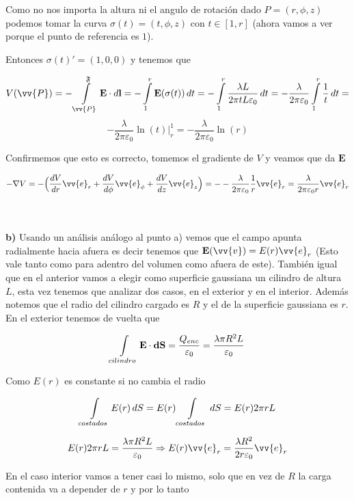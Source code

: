 \documentclass[leqno, 12pt, twoside, letterpaper]{book}
\def\efield{\textbf{E}}
\def\vdiff{\textbf{dS}}
\def\lineInt#1#2#3{\int\displaylimits_{#2}^{#3} #1 \cdot d\textbf{l}}
\begin{document}
Como no nos importa la altura ni el angulo de rotación dado $P = (r, \phi, z)$ podemos tomar la curva $\sigma(t) = (t, \phi, z)$ con $t \in [1, r]$ (ahora vamos a ver porque el punto de referencia es $1$).

Entonces $\sigma(t)' = (1, 0, 0)$ y tenemos que


$$ V(\vv{P}) = -\lineInt{\efield}{\vv{P}}{\mathfrak{F}} = - \int\displaylimits_{1}^{r} \efield(\sigma(t)) \, dt  
=  - \int\displaylimits_{1}^{r} \dfrac{\lambda L}{2\pi t L \varepsilon_0} \, dt 
=  - \dfrac{\lambda }{2\pi  \varepsilon_0} \int\displaylimits_{1}^{r} \dfrac{1}{t} \, dt = $$
$$ - \dfrac{\lambda }{2\pi  \varepsilon_0} \ln(t) \Big\rvert_{r}^{1} = - \dfrac{\lambda }{2\pi  \varepsilon_0} \ln(r) 
$$ 

Confirmemos que esto es correcto, tomemos el gradiente de $V$ y veamos que da $\efield$

$$ - \nabla V = - \Big(\dfrac{dV}{dr} \vv{e}_r + \dfrac{dV}{d\phi} \vv{e}_{\phi} + \dfrac{dV}{dz} \vv{e}_z\Big) = - - \dfrac{\lambda}{2\pi \varepsilon_0} \dfrac{1}{r} \vv{e}_r =  \dfrac{\lambda}{2\pi \varepsilon_0 r} \vv{e}_r $$

\hfill\\\hfill\\
\textbf{b)} Usando un análisis análogo al punto a) vemos que el campo apunta radialmente hacia afuera es decir tenemos que $\efield(\vv{v}) = E(r) \vv{e}_r$ (Esto vale tanto como para adentro del volumen como afuera de este). También igual que en el anterior vamos a elegir como superficie gaussiana un cilindro de altura $L$, esta vez tenemos que analizar dos casos, en el exterior y en el interior. Además notemos que el radio del cilindro cargado es $R$ y el de la superficie gaussiana es $r$. 
\hfill\\

En el exterior tenemos de vuelta que  

\[ \int\displaylimits_{cilindro} \efield \cdot \vdiff = \dfrac{Q_{enc}}{\varepsilon_0} = \dfrac{\lambda\pi R^2 L}{\varepsilon_0} \]

Como $E(r)$ es constante si no cambia el radio

\[ \int\displaylimits_{costados} E(r) \, dS = E(r) \int\displaylimits_{costados}  \, dS = E(r) 2 \pi r L\]

\[ E(r) 2 \pi r L = \dfrac{\lambda\pi R^2 L}{\varepsilon_0} \Rightarrow  E(r) \vv{e}_r = \dfrac{\lambda R^2 }{2 r \varepsilon_0} \vv{e}_r\]

En el caso interior vamos a tener casi lo mismo, solo que en vez de $R$ la carga contenida va a depender de $r$ y por lo tanto 
\end{document}
